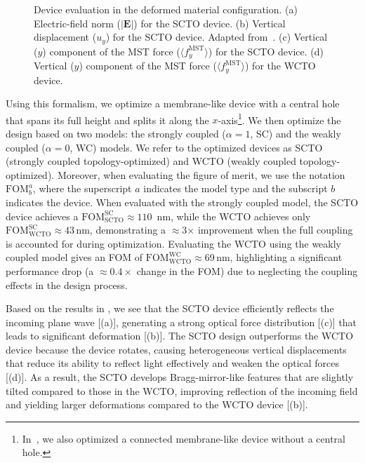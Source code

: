 \begin{figure}[tb]
    \centering
    \caption{Device evaluation in the deformed material configuration. (a) Electric-field norm ($\vert\mathbf{E}\vert$) for the SCTO device. (b) Vertical displacement ($u_y$) for the SCTO device. Adapted from~\cite{ownpub5}.
     (c) Vertical ($y$) component of the MST force ($\langle f^\text{MST}_y\rangle$) for the SCTO device. (d) Vertical ($y$) component of
      the MST force ($\langle f^\text{MST}_y\rangle$) for the WCTO device.}
    \label{fig:SC}
\end{figure}


Using this formalism, we optimize a membrane-like device with a central hole that spans its full height and splits it along the $x$-axis\footnote{In~\cite{ownpub5}, we also optimized a connected membrane-like device without a central hole.}. We then optimize the design based on two models: the strongly 
coupled ($\alpha = 1$, SC) and the weakly coupled ($\alpha = 0$, WC) models. We refer to the optimized devices as SCTO 
(strongly coupled topology-optimized) and WCTO (weakly coupled topology-optimized). Moreover, when evaluating the 
figure of merit, we use the notation $\text{FOM}^a_b$, where the superscript $a$ indicates the model type and the subscript $b$ indicates the device. 
When evaluated with the strongly coupled model, the SCTO device achieves a $\text{FOM}^\text{SC}_\text{SCTO}\approx 110$\, nm, while the WCTO achieves only
$\text{FOM}^\text{SC}_\text{WCTO}\approx 43$\,nm, demonstrating a $\approx$3$\times$ improvement when the full coupling
 is accounted for during optimization. Evaluating the WCTO using the
 weakly coupled model gives an FOM of $\text{FOM}^\text{WC}_\text{WCTO}\approx$69\,nm, highlighting
 a significant performance drop (a $\approx 0.4 \times$ change in the FOM) due to neglecting the coupling effects in the design process. 
        
        
 Based on the results in , we see that the SCTO device efficiently reflects
 the incoming plane wave [(a)], generating a strong optical force distribution
 [(c)] that leads to significant deformation [(b)]. 
 The SCTO design outperforms the WCTO device because the device rotates, causing heterogeneous
 vertical displacements that reduce its ability to reflect light effectively and weaken the
 optical forces [(d)]. As a result, the SCTO develops Bragg-mirror-like features
 that are slightly tilted compared to those in the WCTO, improving reflection of the incoming field
 and yielding larger deformations compared to the WCTO device [(b)].
        

